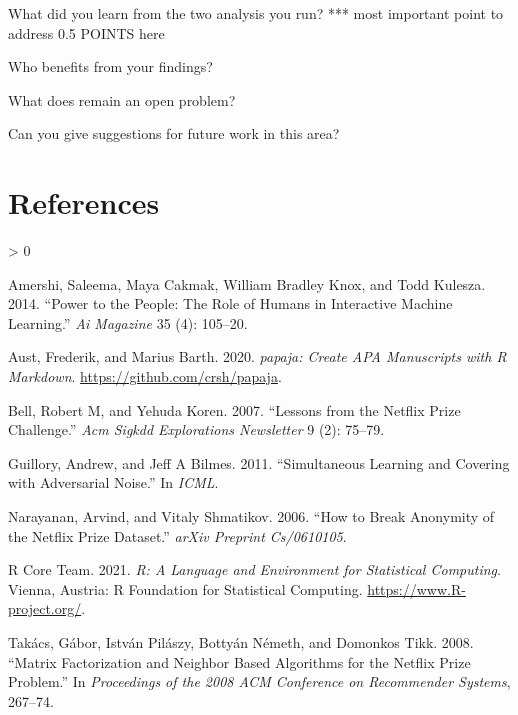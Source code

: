 \documentclass[
  man]{apa6}
\newlength{\cslhangindent}
\newenvironment{CSLReferences}[2] %
 {%
  \setlength{\parindent}{0pt}
  \ifodd #1 \everypar{\setlength{\hangindent}{\cslhangindent}}\ignorespaces\fi
  \ifnum #2 > 0
  \setlength{\parskip}{#2\baselineskip}
  \fi
 }%
 {}
\begin{document}
What did you learn from the two analysis you run? *** most important
point to address 0.5 POINTS here

Who benefits from your findings?

What does remain an open problem?

Can you give suggestions for future work in this area?

\newpage

\hypertarget{references}{%
\section{References}\label{references}}

\begingroup
\setlength{\parindent}{-0.5in}
\setlength{\leftskip}{0.5in}

\hypertarget{refs}{}
\begin{CSLReferences}{1}{0}
\leavevmode\hypertarget{ref-amershi2014power}{}%
Amershi, Saleema, Maya Cakmak, William Bradley Knox, and Todd Kulesza.
2014. {``Power to the People: The Role of Humans in Interactive Machine
Learning.''} \emph{Ai Magazine} 35 (4): 105--20.

\leavevmode\hypertarget{ref-R-papaja}{}%
Aust, Frederik, and Marius Barth. 2020. \emph{{papaja}: {Create} {APA}
Manuscripts with {R Markdown}}. \url{https://github.com/crsh/papaja}.

\leavevmode\hypertarget{ref-bell2007lessons}{}%
Bell, Robert M, and Yehuda Koren. 2007. {``Lessons from the Netflix
Prize Challenge.''} \emph{Acm Sigkdd Explorations Newsletter} 9 (2):
75--79.

\leavevmode\hypertarget{ref-guillory2011simultaneous}{}%
Guillory, Andrew, and Jeff A Bilmes. 2011. {``Simultaneous Learning and
Covering with Adversarial Noise.''} In \emph{ICML}.

\leavevmode\hypertarget{ref-narayanan2006break}{}%
Narayanan, Arvind, and Vitaly Shmatikov. 2006. {``How to Break Anonymity
of the Netflix Prize Dataset.''} \emph{arXiv Preprint Cs/0610105}.

\leavevmode\hypertarget{ref-R-base}{}%
R Core Team. 2021. \emph{R: A Language and Environment for Statistical
Computing}. Vienna, Austria: R Foundation for Statistical Computing.
\url{https://www.R-project.org/}.

\leavevmode\hypertarget{ref-takacs2008matrix}{}%
Takács, Gábor, István Pilászy, Bottyán Németh, and Domonkos Tikk. 2008.
{``Matrix Factorization and Neighbor Based Algorithms for the Netflix
Prize Problem.''} In \emph{Proceedings of the 2008 ACM Conference on
Recommender Systems}, 267--74.

\end{CSLReferences}

\endgroup
\end{document}
